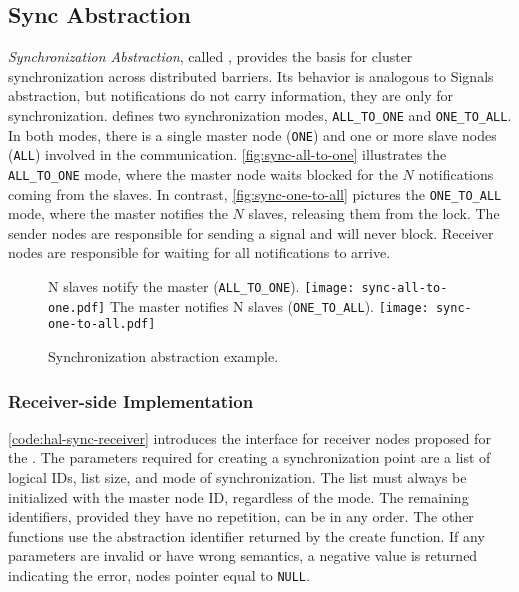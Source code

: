 
		\subsection{Sync Abstraction}
		\label{sec.sync-abs}

			\textit{Synchronization Abstraction}, called \sync, provides the
			basis for cluster synchronization across distributed barriers.
			Its behavior is analogous to \posix Signals abstraction, but
			notifications do not carry information, they are only for synchronization.
			\sync defines two synchronization modes, \texttt{ALL\_TO\_ONE} and
			\texttt{ONE\_TO\_ALL}. In both modes, there is a single master node
			(\texttt{ONE}) and one or more slave nodes
			(\texttt{ALL}) involved in the communication. \autoref{fig:sync-all-to-one} illustrates the
			\texttt{ALL\_TO\_ONE} mode, where the master node waits blocked for
			the $N$ notifications coming from the slaves. In contrast,
			\autoref{fig:sync-one-to-all} pictures the \texttt{ONE\_TO\_ALL} mode,
			where the master notifies the $N$ slaves, releasing them from the lock.
			The sender nodes are responsible for sending a signal and will never
			block. Receiver nodes are responsible for waiting for all notifications
			to arrive.

			\begin{figure}[!tb]
				\centering%
				\caption{Synchronization abstraction example.}%
				\label{fig:sync-concepts}%

					{N slaves notify the master (\texttt{ALL\_TO\_ONE}).}%
					{\texttt{[image: sync-all-to-one.pdf]}}%
				\hfill%
					{The master notifies N slaves (\texttt{ONE\_TO\_ALL}).}%
					{\texttt{[image: sync-one-to-all.pdf]}}%

			\end{figure}

			\subsubsection{Receiver-side Implementation}

				\autoref{code:hal-sync-receiver} introduces the \sync interface for
				receiver nodes proposed for the \nanvixhal. The parameters required
				for creating a synchronization point are a list of logical IDs, list size,
				and mode of synchronization. The list must always be initialized
				with the master node ID, regardless of the mode. The remaining identifiers,
				provided they have no repetition, can be in any order. The other
				functions use the abstraction identifier returned by the create
				function. If any parameters are invalid or have wrong
				semantics, a
				negative value is returned indicating the error, \eg nodes pointer
				equal to \texttt{NULL}.

